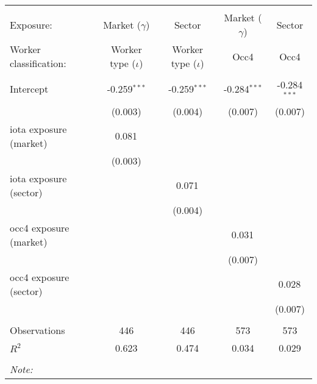 \begin{tabular}{@{\extracolsep{5pt}}lcccc}
\\[-1.8ex]\hline
\hline \\[-1.8ex]
\hline \\[-1.8ex]
 Exposure: & Market ($\gamma$) & Sector & Market ($\gamma$) & Sector \\
 Worker classification: & Worker type ($\iota$) & Worker type ($\iota$) & Occ4 & Occ4 \\
 \hline &  &  &  &  \\
 Intercept & -0.259$^{***}$ & -0.259$^{***}$ & -0.284$^{***}$ & -0.284$^{***}$ \\
& (0.003) & (0.004) & (0.007) & (0.007) \\
 iota exposure (market) & 0.081$^{}$ & & & \\
& (0.003) & & & \\
 iota exposure (sector) & & 0.071$^{}$ & & \\
& & (0.004) & & \\
 occ4 exposure (market) & & & 0.031$^{}$ & \\
& & & (0.007) & \\
 occ4 exposure (sector) & & & & 0.028$^{}$ \\
& & & & (0.007) \\
\hline \\[-1.8ex]
 Observations & 446 & 446 & 573 & 573 \\
 $R^2$ & 0.623 & 0.474 & 0.034 & 0.029 \\
\hline
\hline \\[-1.8ex]
\textit{Note:}\end{tabular}